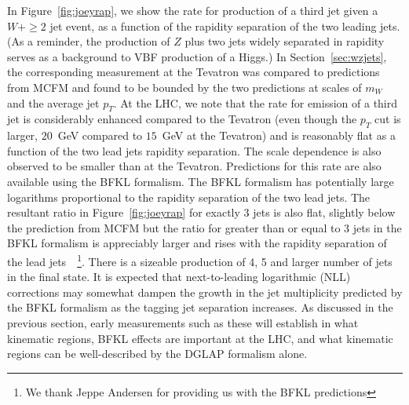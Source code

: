 \documentclass[12pt]{iopart}
\begin{document}
In Figure~\ref{fig:joeyrap}, we show the rate for production of a third jet given a $W+\ge2$ jet event, as a function of the rapidity
separation of the two leading jets. (As a reminder, the production of $Z$ plus two jets widely separated in rapidity serves as a
background to VBF production of a Higgs.)  In Section~\ref{sec:wzjets}, the corresponding measurement at the Tevatron was compared to
predictions from MCFM and found to be bounded by the two predictions at scales of $m_W$ and the average jet $p_T$. At the LHC, we
note that the rate for emission of a third jet is considerably enhanced compared to the Tevatron
(even though the $p_T$ cut is larger, $20$~GeV compared to $15$~GeV at the Tevatron) and is reasonably flat as a function
of the two lead jets rapidity separation.  The scale dependence is also observed to be smaller than at the Tevatron. Predictions for
this rate are also available using the BFKL formalism. The BFKL formalism has potentially large logarithms proportional to the
rapidity separation of the two lead jets.
The resultant ratio in Figure~\ref{fig:joeyrap} for exactly 3 jets is also flat, slightly below the prediction
from MCFM but the ratio for greater than or equal to 3 jets in the BFKL formalism is appreciably larger and rises with the
rapidity separation of the lead jets~\cite{Andersen:2001ja,Andersen:2006sp}~\footnote{We thank Jeppe Andersen for providing us with the BFKL
predictions}.
There is a sizeable production of 4, 5 and larger number of jets in the final state. It is expected
that next-to-leading logarithmic (NLL) corrections may somewhat dampen the growth in the jet
multiplicity predicted by the BFKL formalism as the tagging jet separation increases.  As discussed in the previous section, early
measurements such as these will establish in what kinematic regions, BFKL effects are important at the LHC, and what kinematic
regions can be well-described by the DGLAP formalism alone. 
%
\end{document}
